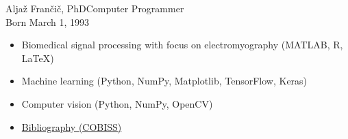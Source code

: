 \documentclass{article}
\begin{document}
\begin{cv}[avatar]{Aljaž Frančič, PhD}{Computer Programmer\\\small{Born March 1, 1993}}





\begin{cvevent}[2018][2022]
    \begin{itemize}
        \item Biomedical signal processing with focus on electromyography \newline (MATLAB, R, LaTeX)
        \item Machine learning (Python, NumPy, Matplotlib, TensorFlow, Keras)
        \item Computer vision (Python, NumPy, OpenCV)
        \item \href{https://bib.cobiss.net/bibliographies/si/webBiblio/bib201_20231204_183141_52032.html}{Bibliography (COBISS)} 
    \end{itemize}
\end{cvevent}




\end{cv}
\end{document}
